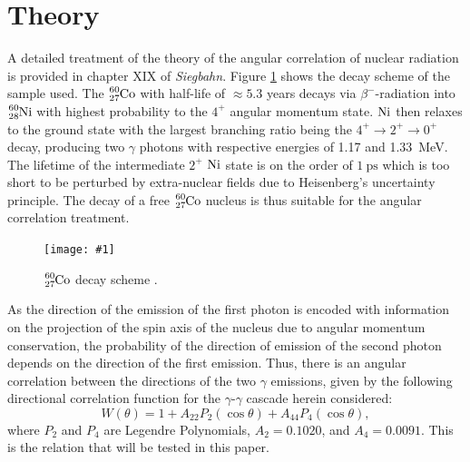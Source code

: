 \documentclass[twocolumn]{article}
\newcommand{\insertFigure}[1]{%
   \texttt{[image: \#1]}%
}
\begin{document}
\section{Theory}
A detailed treatment of the theory of the angular correlation of nuclear radiation is provided in chapter XIX of \textsl{Siegbahn}.\cite{sieg}
 Figure \ref{fig:cobalt_scheme} shows the decay scheme of the sample used. The $\ce{_27^{60}Co}$ with half-life of $\approx 5.3$ years decays via $\beta^-$-radiation into $\ce{_28^{60}Ni}$ with highest probability to the $4^+$ angular momentum state. $\ce{Ni}$ then relaxes to the ground state with the largest branching ratio being the $4^+\rightarrow2^+\rightarrow 0^+$ decay, producing two $\gamma$ photons with respective energies of 1.17 and 1.33~MeV. The lifetime of the intermediate $2^+$ $\ce{Ni}$ state is on the order of $\SI{1}{\pico\second}$ which is too short to be perturbed by extra-nuclear fields due to Heisenberg's uncertainty principle. The decay of a free $\ce{_27^{60}Co}$ nucleus is thus suitable for the angular correlation treatment.
\begin{figure}[!h]
\centering
\insertFigure{cobalt_scheme.png}
\caption{$\ce{_27^{60}Co}$ decay scheme \cite{cobalt_scheme}.}
\label{fig:cobalt_scheme}
\end{figure}
\par As the direction of the emission of the first photon is encoded with information on the projection of the spin axis of the nucleus due to angular momentum conservation, the probability of the direction of emission of the second photon depends on the direction of the first emission. Thus, there is an angular correlation between the directions of the two $\gamma$ emissions, given by the following directional correlation function for the $\gamma$-$\gamma$ cascade herein considered:
\begin{equation}
W(\theta) = 1+A_{22}P_2(\cos{\theta})+A_{44}P_4(\cos{\theta}), \label{eq:corr}
\end{equation}
where $P_2$ and $P_4$ are Legendre Polynomials, $A_2 = 0.1020$, and $A_4 = 0.0091$.\cite{sieg} This is the relation that will be tested in this paper.
\newpage
\end{document}
